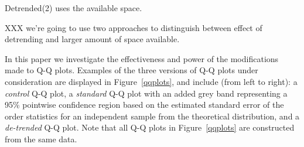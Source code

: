 \documentclass{article}\usepackage[]{graphicx}\usepackage[]{color}
\newcommand{\hh}[1]{{\color{magenta} #1}}
\newcommand{\alnote}[1]{\todo[inline,color=green!40]{#1}}
\begin{document}
\hh{Detrended(2) uses the available space.}


\hh{XXX we're going to use two approaches to distinguish between effect of detrending and larger amount of space available. }

In this paper we investigate the effectiveness and power of the modifications made to Q-Q plots.
Examples of the three versions of Q-Q plots under consideration are displayed in Figure~\ref{qqplots}, and include (from left to right): a \emph{control} Q-Q plot, a \emph{standard} Q-Q plot with an added grey band representing a 95\% pointwise confidence region \citep{Davison:1997}
based on the estimated standard error of the order statistics for an independent sample from the theoretical distribution, and a \emph{de-trended} Q-Q plot. Note that all Q-Q plots in Figure~\ref{qqplots} are constructed from the same data. 
\end{document}
